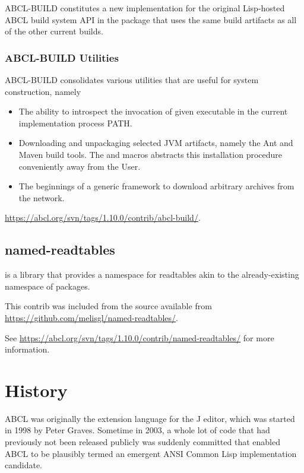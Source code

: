 \documentclass[10pt]{book}
\begin{document}
\textsc{ABCL-BUILD} constitutes a new implementation for the original
Lisp-hosted \textsc{ABCL} build system API in the package
 that uses the same build artifacts as all of the
other current builds.

\subsection{ABCL-BUILD Utilities}

\textsc{ABCL-BUILD} consolidates various utilities that are useful
for system construction, namely

\begin{itemize}

\item The ability to introspect the invocation of given executable in
  the current implementation process PATH.

\item Downloading and unpackaging selected JVM artifacts, namely the
  Ant and Maven build tools.  The  and
   macros abstracts this installation
  procedure conveniently away from the User.

\item The beginnings of a generic framework to download arbitrary
    archives from the network.
\end{itemize}

\url{https://abcl.org/svn/tags/1.10.0/contrib/abcl-build/}.

\section{named-readtables}
\label{section:named-readtables}

 is a library that provides a namespace for
readtables akin to the already-existing namespace of packages.

This contrib was included from the source available from
\url{https://github.com/melisgl/named-readtables/}.

See \url{https://abcl.org/svn/tags/1.10.0/contrib/named-readtables/} for
more information.

\chapter{History}

\textsc{ABCL} was originally the extension language for the J editor, which was
started in 1998 by Peter Graves.  Sometime in 2003, a whole lot of
code that had previously not been released publicly was suddenly
committed that enabled ABCL to be plausibly termed an emergent ANSI
Common Lisp implementation candidate.
\end{document}
